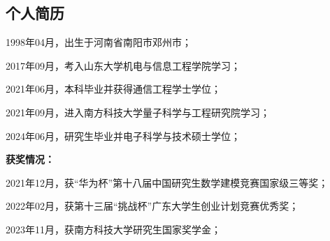 
\begin{resume}

  \section*{个人简历} %

  1998年04月，出生于河南省南阳市邓州市；

  2017年09月，考入山东大学机电与信息工程学院学习；
  
  2021年06月，本科毕业并获得通信工程学士学位；

  2021年09月，进入南方科技大学量子科学与工程研究院学习；
  
  2024年06月，研究生毕业并电子科学与技术硕士学位；

  \textbf{获奖情况：}

  2021年12月，获“华为杯”第十八届中国研究生数学建模竞赛国家级三等奖；

  2022年02月，获第十三届“挑战杯”广东大学生创业计划竞赛优秀奖；

  2023年11月，获南方科技大学研究生国家奖学金；
  







\end{resume}
